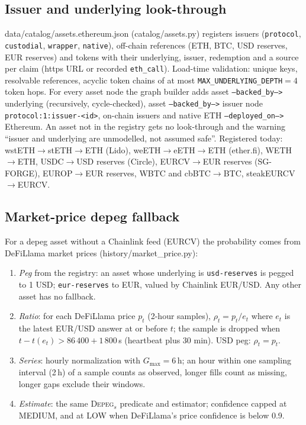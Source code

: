 \documentclass[11pt,a4paper]{article}
\newcommand{\code}[1]{\texttt{#1}}
\newcommand{\src}[1]{\textsf{\small #1}}
\begin{document}
\subsection{Issuer and underlying look-through}\label{sec:lookthrough}

\src{data/catalog/assets.ethereum.json} (\src{catalog/assets.py}) registers
issuers (\code{protocol}, \code{custodial}, \code{wrapper}, \code{native}),
off-chain references (ETH, BTC, USD reserves, EUR reserves) and tokens with their
underlying, issuer, redemption and a source per claim (https URL or recorded
\code{eth\_call}). Load-time validation: unique keys, resolvable references,
acyclic token chains of at most \code{MAX\_UNDERLYING\_DEPTH}$=4$ token hops. For
every asset node the graph builder adds asset \code{--backed\_by-->} underlying
(recursively, cycle-checked), asset \code{--backed\_by-->} issuer node
\code{protocol:1:issuer-<id>}, on-chain issuers and native ETH
\code{--deployed\_on-->} Ethereum. An asset not in the registry gets no
look-through and the warning ``issuer and underlying are unmodelled, not assumed
safe''. Registered today: wstETH$\to$stETH$\to$ETH (Lido), weETH$\to$eETH$\to$ETH
(ether.fi), WETH$\to$ETH, USDC$\to$USD reserves (Circle), EURCV$\to$EUR reserves
(SG-FORGE), EUROP$\to$EUR reserves, WBTC and cbBTC$\to$BTC, steakEURCV$\to$EURCV.

\subsection{Market-price depeg fallback}\label{sec:marketprice}

For a depeg asset without a Chainlink feed (EURCV) the probability comes from
DeFiLlama market prices (\src{history/market\_price.py}):
\begin{enumerate}
\item \emph{Peg} from the registry: an asset whose underlying is
  \code{usd-reserves} is pegged to 1 USD; \code{eur-reserves} to EUR, valued by
  Chainlink EUR/USD. Any other asset has no fallback.
\item \emph{Ratio}: for each DeFiLlama price $p_t$ (2-hour samples),
  $\rho_t=p_t/e_{t}$ where $e_t$ is the latest EUR/USD answer at or before $t$;
  the sample is dropped when $t-t(e_t)>86\,400+1\,800$\,s (heartbeat plus 30 min).
  USD peg: $\rho_t=p_t$.
\item \emph{Series}: hourly normalization with $G_{\max}=6$\,h; an hour within one
  sampling interval (2\,h) of a sample counts as observed, longer fills count as
  missing, longer gaps exclude their windows.
\item \emph{Estimate}: the same \textsc{Depeg}$_s$ predicate and estimator;
  confidence capped at MEDIUM, and at LOW when DeFiLlama's price confidence is
  below 0.9.
\end{enumerate}
\end{document}
